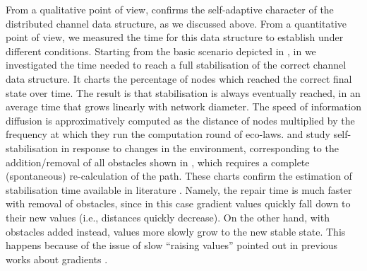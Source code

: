 \documentclass[12pt,a4paper,twoside,openright]{book}
\begin{document}
From a qualitative point of view,  confirms the self-adaptive character of the distributed channel data structure, as we discussed above.
%
From a quantitative point of view, we measured the time for this data structure to establish under different conditions.
%
Starting from the basic scenario depicted in , in  we investigated the time needed to reach a full stabilisation of the correct channel data structure. It charts the percentage of nodes which reached the correct final state over time.
%
The result is that stabilisation is always eventually reached, in an average time that grows linearly with network diameter.
%
The speed of information diffusion is approximatively computed as the distance of nodes multiplied by the frequency at which they run the computation round of eco-laws.
%
 and  study self-stabilisation in response to changes in the environment, corresponding to the addition/removal of all obstacles shown in , which requires a complete (spontaneous) re-calculation of the path.
%
These charts confirm the estimation of stabilisation time available in literature \cite{crf}.
%
Namely, the repair time is much faster with removal of obstacles, since in this case gradient values quickly fall down to their new values (i.e., distances quickly decrease).
%
On the other hand, with obstacles added instead, values more slowly grow to the new stable state.
%
This happens because of the issue of slow ``raising values'' pointed out in previous works about gradients \cite{crf}.
\end{document}
